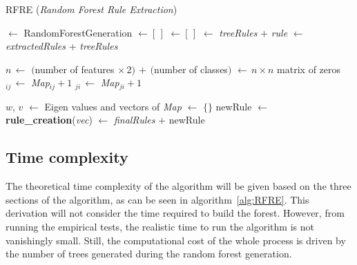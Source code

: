 \documentclass[10pt]{article}
\begin{document}
\begin{algorithm}[!ht]
\caption{RFRE (\textit{Random Forest Rule Extraction})}\label{alg:RFRE}
\begin{algorithmic}[1]
 $\gets$ RandomForestGeneration		
 $\gets [\, ]$
	  $\gets [\,]$
		 $\gets$ {\sl treeRules} $+$ {\sl rule} 
	\EndFor
	 $\gets$ {\sl extractedRules} + {\sl treeRules}
\EndFor

\State $n \, \gets$ $($number of features $\times \, 2) \, + \,($number of classes$)$ 
 $\gets \, n\times n$ matrix of zeros
		$_{ij} \, \gets$  {\sl Map}$_{ij} + 1$
		$_{ji} \, \gets$  {\sl Map}$_{ji} + 1$
	\EndIf
\EndFor

\State $w, \, v$ $\gets$ Eigen values and vectors of {\sl Map}
 $\gets$ $\{\}$
	\State newRule $\gets $ \textbf{rule\_creation}({\sl  vec})
	 $\gets$ {\sl finalRules} $+$ newRule
	\EndIf
\EndFor
\State {}
\end{algorithmic}
\end{algorithm}

\subsection{Time complexity}
The theoretical time complexity of the algorithm will be given based on the three sections of the algorithm, as can be seen in algorithm~\ref{alg:RFRE}. This derivation will not consider the time required to build the forest. However, from running the empirical tests, the realistic time to run the algorithm is not vanishingly small. Still, the computational cost of the whole process is driven by the number of trees generated during the random forest generation.
\end{document}
